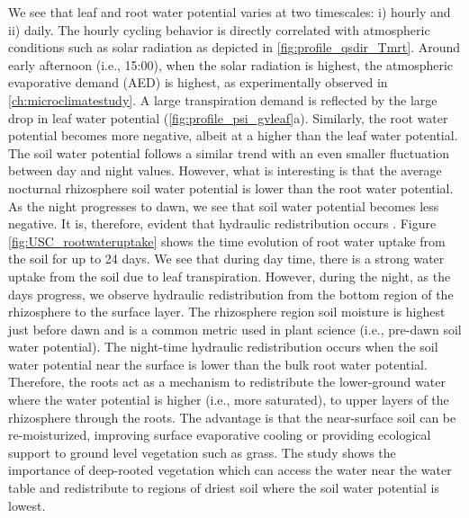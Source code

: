 We see that leaf and root water potential varies at two timescales: i) hourly and ii) daily. The hourly cycling behavior is directly correlated with atmospheric conditions such as solar radiation as depicted in \cref{fig:profile_qsdir_Tmrt}. Around early afternoon (i.e., 15:00), when the solar radiation is highest, the atmospheric evaporative demand (AED) is highest, as experimentally observed in \cref{ch:microclimatestudy}. A large transpiration demand is reflected by the large drop in leaf water potential (\cref{fig:profile_psi_gvleaf}a). Similarly, the root water potential becomes more negative, albeit at a higher than the leaf water potential. The soil water potential follows a similar trend with an even smaller fluctuation between day and night values. However, what is interesting is that the average nocturnal rhizosphere soil water potential is lower than the root water potential. As the night progresses to dawn, we see that soil water potential becomes less negative. It is, therefore, evident that hydraulic redistribution occurs \citep{Volpe2013, Huang2017}. Figure \cref{fig:USC_rootwateruptake} shows the time evolution of root water uptake from the soil for up to 24 days. We see that during day time, there is a strong water uptake from the soil due to leaf transpiration. However, during the night, as the days progress, we observe hydraulic redistribution from the bottom region of the rhizosphere to the surface layer. The rhizosphere region soil moisture is highest just before dawn and is a common metric used in plant science (i.e., pre-dawn soil water potential). The night-time hydraulic redistribution occurs when the soil water potential near the surface is lower than the bulk root water potential. Therefore, the roots act as a mechanism to redistribute the lower-ground water where the water potential is higher (i.e., more saturated), to upper layers of the rhizosphere through the roots. The advantage is that the near-surface soil can be re-moisturized, improving surface evaporative cooling or providing ecological support to ground level vegetation such as grass. The study shows the importance of deep-rooted vegetation which can access the water near the water table and redistribute to regions of driest soil where the soil water potential is lowest.

